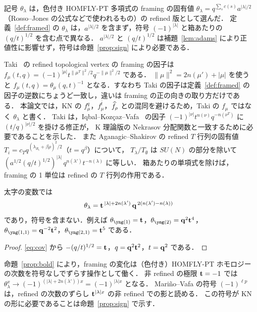 \begin{remark}
記号 $\theta_\lambda$ は，色付き HOMFLY-PT 多項式の framing の固有値 $\theta_\lambda=q^{\sum_{s}c(s)}a^{|\lambda|/2}$（Rosso--Jones の公式などで使われるもの）の refined 版として選んだ．
定義~\ref{def:framed} の $\theta_\lambda$ は，$a^{|\lambda|/2}$ を含まず，符号 $(-1)^{|\lambda|}$ と箱あたりの $(q/t)^{1/2}$ を含む点で異なる．
$a^{|\lambda|/2}$ と $(q/t)^{1/2}$ は補題~\ref{lem:adams} により正値性に影響せず，符号は命題~\ref{prop:sign} により必要である．
\end{remark}

\begin{remark}\label{rem:Taki}
Taki~\cite{Taki07} の refined topological vertex の framing の因子は
$f_\mu(t,q)=(-1)^{|\mu|}t^{\|\mu^T\|^2/2}q^{-\|\mu\|^2/2}$ である．
$\|\mu\|^2=2n(\mu')+|\mu|$ を使うと $f_\mu(t,q)=\theta_\mu(q,t)^{-1}$ となる．すなわち Taki の因子は定義~\ref{def:framed} の因子の逆数にちょうど一致し，違いは framing の正の向きの取り方だけである．
本論文では，KN の $f^q_\mu$，$f^{\bar t}_\mu$，$\widehat f_\rho$ との混同を避けるため，Taki の $f_\mu$ ではなく $\theta_\lambda$ と書く．
Taki は，Iqbal--Kozçaz--Vafa~\cite{Iqbal07} の因子 $(-1)^{|\nu|}t^{n(\nu)}q^{-n(\nu^T)}$ に $(t/q)^{|\nu|/2}$ を掛ける修正が，
K 理論版の Nekrasov 分配関数と一致するために必要であることを示した．
また Aganagic--Shakirov の refined $T$ 行列の固有値 $T_i=c_Tq^{(\lambda_{R_i}+\beta\rho)^2/2}$（$t=q^\beta$）について，
$T_\lambda/T_\emptyset$ は $SU(N)$ の部分を除いて $(a^{1/2}(q/t)^{1/2})^{|\lambda|}\,q^{n(\lambda')}t^{-n(\lambda)}$ に等しい．
箱あたりの単項式を除けば，framing の 1 単位は refined の $T$ 行列の作用である．
\end{remark}

\begin{proposition}\label{prop:bold}
太字の変数では
\[
\theta_\lambda=\mathbf{t}^{\,|\lambda|+2n(\lambda')}\,\mathbf{q}^{\,2(n(\lambda')-n(\lambda))}
\]
であり，符号を含まない．例えば $\theta_{\yng(1)}=\bt$，$\theta_{\yng(2)}=\bq^2\bt^4$，$\theta_{\yng(1,1)}=\bq^{-2}\bt^2$，$\theta_{\yng(2,1)}=\bt^5$ である．
\end{proposition}
\begin{proof}
\eqref{eq:cov} から $-(q/t)^{1/2}=\mathbf{t}$，$q=\mathbf{q}^2\mathbf{t}^2$，$t=\mathbf{q}^2$ である．
\end{proof}

\begin{remark}
命題~\ref{prop:bold} により，framing の変化は（色付き）HOMFLY-PT ホモロジーの次数を符号なしでずらす操作として働く．
非 refined の極限 $\mathbf{t}=-1$ では $\theta_\lambda^x\to(-1)^{(|\lambda|+2n(\lambda'))x}=(-1)^{|\lambda|x}$ となる．
Mariño--Vafa の符号 $(-1)^{\ell p}$ は，refined の次数のずらし $\mathbf{t}^{|\lambda|x}$ の非 refined での影と読める．
この符号が KN の形に必要であることは命題~\ref{prop:sign} で示す．
\end{remark}


